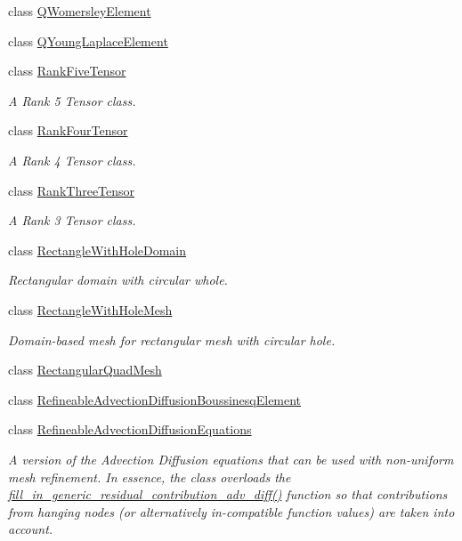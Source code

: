 \begin{DoxyCompactItemize}
\item 
class \hyperlink{classoomph_1_1QWomersleyElement}{Q\+Womersley\+Element}
\item 
class \hyperlink{classoomph_1_1QYoungLaplaceElement}{Q\+Young\+Laplace\+Element}
\item 
class \hyperlink{classoomph_1_1RankFiveTensor}{Rank\+Five\+Tensor}
\begin{DoxyCompactList}\small\item\em A Rank 5 Tensor class. \end{DoxyCompactList}\item 
class \hyperlink{classoomph_1_1RankFourTensor}{Rank\+Four\+Tensor}
\begin{DoxyCompactList}\small\item\em A Rank 4 Tensor class. \end{DoxyCompactList}\item 
class \hyperlink{classoomph_1_1RankThreeTensor}{Rank\+Three\+Tensor}
\begin{DoxyCompactList}\small\item\em A Rank 3 Tensor class. \end{DoxyCompactList}\item 
class \hyperlink{classoomph_1_1RectangleWithHoleDomain}{Rectangle\+With\+Hole\+Domain}
\begin{DoxyCompactList}\small\item\em Rectangular domain with circular whole. \end{DoxyCompactList}\item 
class \hyperlink{classoomph_1_1RectangleWithHoleMesh}{Rectangle\+With\+Hole\+Mesh}
\begin{DoxyCompactList}\small\item\em Domain-\/based mesh for rectangular mesh with circular hole. \end{DoxyCompactList}\item 
class \hyperlink{classoomph_1_1RectangularQuadMesh}{Rectangular\+Quad\+Mesh}
\item 
class \hyperlink{classoomph_1_1RefineableAdvectionDiffusionBoussinesqElement}{Refineable\+Advection\+Diffusion\+Boussinesq\+Element}
\item 
class \hyperlink{classoomph_1_1RefineableAdvectionDiffusionEquations}{Refineable\+Advection\+Diffusion\+Equations}
\begin{DoxyCompactList}\small\item\em A version of the Advection Diffusion equations that can be used with non-\/uniform mesh refinement. In essence, the class overloads the \hyperlink{classoomph_1_1RefineableAdvectionDiffusionEquations_aa42c5000c45380b8370565fac3990320}{fill\+\_\+in\+\_\+generic\+\_\+residual\+\_\+contribution\+\_\+adv\+\_\+diff()} function so that contributions from hanging nodes (or alternatively in-\/compatible function values) are taken into account. \end{DoxyCompactList}\item 

\end{DoxyCompactItemize}
